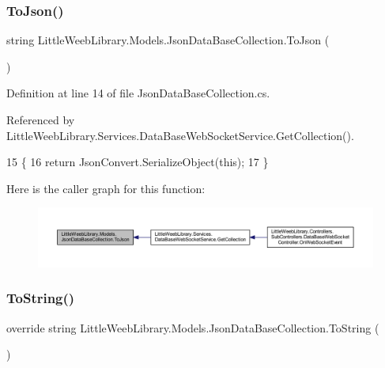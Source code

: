 \subsubsection{\texorpdfstring{To\+Json()}{ToJson()}}
{\footnotesize\ttfamily string Little\+Weeb\+Library.\+Models.\+Json\+Data\+Base\+Collection.\+To\+Json (\begin{DoxyParamCaption}{ }\end{DoxyParamCaption})}



Definition at line 14 of file Json\+Data\+Base\+Collection.\+cs.



Referenced by Little\+Weeb\+Library.\+Services.\+Data\+Base\+Web\+Socket\+Service.\+Get\+Collection().


\begin{DoxyCode}
15         \{
16             \textcolor{keywordflow}{return} JsonConvert.SerializeObject(\textcolor{keyword}{this});
17         \}
\end{DoxyCode}
Here is the caller graph for this function\+:\nopagebreak
\begin{figure}[H]
\begin{center}
\leavevmode
\includegraphics[width=350pt]{class_little_weeb_library_1_1_models_1_1_json_data_base_collection_a2df5ba56e4691271213328b9bc2dbb1f_icgraph}
\end{center}
\end{figure}
\mbox{\label{class_little_weeb_library_1_1_models_1_1_json_data_base_collection_ac50c3070bcc5af0ca9f223bb88a1ef6c}} 
\subsubsection{\texorpdfstring{To\+String()}{ToString()}}
{\footnotesize\ttfamily override string Little\+Weeb\+Library.\+Models.\+Json\+Data\+Base\+Collection.\+To\+String (\begin{DoxyParamCaption}{ }\end{DoxyParamCaption})}



